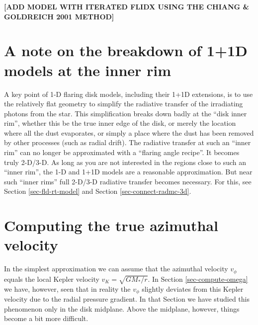 \documentclass{book}
\begin{document}
{\bf [ADD MODEL WITH ITERATED FLIDX USING THE CHIANG \& GOLDREICH 2001 METHOD]}


\section{A note on the breakdown of 1+1D models at the inner rim}
\label{sec-dust-inner-rim}
%
A key point of 1-D flaring disk models, including their 1+1D extensions, is to
use the relatively flat geometry to simplify the radiative transfer of the
irradiating photons from the star. This simplification breaks down badly at the
``disk inner rim'', whether this be the true inner edge of the disk, or merely
the location where all the dust evaporates, or simply a place where the dust has
been removed by other processes (such as radial drift). The radiative transfer
at such an ``inner rim'' can no longer be approximated with a ``flaring angle
recipe''. It becomes truly 2-D/3-D. As long as you are not interested in the
regions close to such an ``inner rim'', the 1-D and 1+1D models are a reasonable
approximation. But near such ``inner rims'' full 2-D/3-D radiative transfer
becomes necessary. For this, see Section \ref{sec-fld-rt-model} and
Section \ref{sec-connect-radmc-3d}.


\section{Computing the true azimuthal velocity}
\label{sec-true-vphi}
%
In the simplest approximation we can assume that the azimuthal velocity $v_\phi$
equals the local Kepler velocity $v_K=\sqrt{GM_{*}/r}$. In Section
\ref{sec-compute-omega} we have, however, seen that in reality the $v_\phi$
slightly deviates from this Kepler velocity due to the radial pressure
gradient. In that Section we have studied this phenomenon only in the disk
midplane. Above the midplane, however, things become a bit more difficult.
\end{document}
